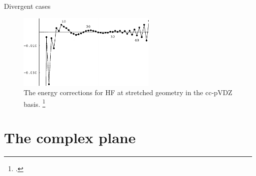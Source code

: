 \documentclass[xcolor=x11names,compress]{beamer}
\renewcommand{\(}{\begin{columns}}
\renewcommand{\)}{\end{columns}}
\newcommand{\<}[1]{\begin{column}{#1}}
\renewcommand{\>}{\end{column}}
\begin{document}
\begin{frame}{Divergent cases}
  
\begin{figure}
    \centering
    \includegraphics[width=0.6\textwidth]{The-energy-corrections-for-HF-at-stretched-geometry-in-the-cc-pVDZ-basis.png}
    \caption{The energy corrections for HF at stretched geometry in the cc-pVDZ basis. \footcite{olsen_divergence_2000}}
    \label{fig:my_label}
\end{figure}

\end{frame}

\section{The complex plane}
\end{document}
